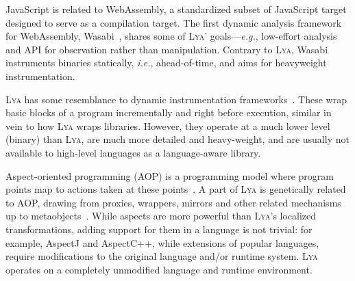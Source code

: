 \documentclass[letterpaper,twocolumn,10pt]{article}
\def\eg{{\em e.g.}, }
\def\ie{{\em i.e.}, }
\newcommand{\sx}[1]{(\S\ref{#1})}
\newcommand{\sys}{{\scshape Lya}\xspace}
\newcommand{\fixme}[1]{{\color{red}#1}}
\begin{document}

JavaScript is related to WebAssembly, a standardized subset of JavaScript target designed to serve as a compilation target.
The first dynamic analysis framework for WebAssembly, Wasabi~\cite{wasabi}, shares some of \sys' goals---\eg low-effort analysis and API for observation rather than manipulation.
Contrary to \sys, Wasabi instruments binaries statically, \ie ahead-of-time, and aims for heavyweight instrumentation.

\sys has some resemblance to dynamic instrumentation frameworks~\cite{pin, valgrind, disl, roadrunner}.
These wrap basic blocks of a program incrementally and right before execution, similar in vein to how \sys wraps libraries.
However, they operate at a much lower level (binary) than \sys, are much more detailed and heavy-weight, and are usually not available to high-level languages as a language-aware library.

Aspect-oriented programming (AOP) is a programming model where program points map to actions taken at these points~\cite{aop}.
A part of \sys is genetically related to AOP, drawing from proxies, wrappers, mirrors and other related mechanisms up to  metaobjects~\cite{metaobject}.
While aspects are more powerful than \sys's localized transformations, adding support for them in a language is not trivial:
  for example, AspectJ and AspectC++, while extensions of popular languages, require modifications to the original language and/or runtime system.
\sys operates on a completely unmodified language and runtime environment.
\end{document}

